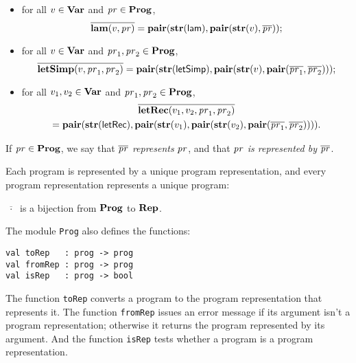 \begin{itemize}
\item for all $v\in\mathbf{Var}$ and $\mathit{pr}\in\mathbf{Prog}$,
  \begin{displaymath}
  \overline{\mathbf{lam}(v,\mathit{pr})} =
  \mathbf{pair}(\mathbf{str}(\mathsf{lam}),
  \mathbf{pair}(\mathbf{str}(v), \overline{\mathit{pr}})) ;
  \end{displaymath}

\item for all $v\in\mathbf{Var}$ and $\mathit{pr}_1,\mathit{pr}_2\in\mathbf{Prog}$,
  \begin{displaymath}
    \overline{\mathbf{letSimp}(v,\mathit{pr}_1,\mathit{pr}_2)} =
    \mathbf{pair}(\mathbf{str}(\mathsf{letSimp}),
    \mathbf{pair}(\mathbf{str}(v),
    \mathbf{pair}(\overline{\mathit{pr}_1}, \overline{\mathit{pr}_2}))) ;
  \end{displaymath}

\item for all $v_1,v_2\in\mathbf{Var}$ and $\mathit{pr}_1,\mathit{pr}_2\in\mathbf{Prog}$,
  \begin{multline*}
  \overline{\mathbf{letRec}(v_1,v_2,\mathit{pr}_1,\mathit{pr}_2)} \\
  = \mathbf{pair}(\mathbf{str}(\mathsf{letRec}),
  \mathbf{pair}(\mathbf{str}(v_1),
  \mathbf{pair}(\mathbf{str}(v_2),
  \mathbf{pair}(\overline{\mathit{pr}_1}, \overline{\mathit{pr}_2})))) .
  \end{multline*}
\end{itemize}
%
If $\mathit{pr}\in\mathbf{Prog}$, we say that $\overline{\mathit{pr}}$ \emph{represents} $\mathit{pr}$,
and that $\mathit{pr}$ \emph{is represented by} $\overline{\mathit{pr}}$.

Each program is represented by a unique program representation, and
every program representation represents a unique program:

\begin{proposition}
$\overline{\;\cdot\;}$ is a bijection from $\mathbf{Prog}$ to $\mathbf{Rep}$.
\end{proposition}

The module \texttt{Prog} also defines the functions:
\begin{verbatim}
val toRep   : prog -> prog
val fromRep : prog -> prog
val isRep   : prog -> bool
\end{verbatim}
%
%
%
The function \texttt{toRep} converts a program to the program representation
that represents it.  The function \texttt{fromRep} issues an error message
if its argument isn't a program representation; otherwise it returns the
program represented by its argument.  And the function \texttt{isRep} tests
whether a program is a program representation.


